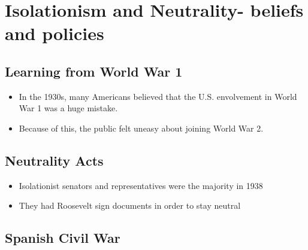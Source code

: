 \documentclass[12pt]{article} %
\begin{document}
	\section{Isolationism and Neutrality- beliefs and policies}

	\subsection{Learning from World War 1}
	\begin{itemize}
		\item In the 1930s, many Americans believed that the U.S. envolvement in World War 1 was a huge mistake.
		\item Because of this, the public felt uneasy about joining World War 2.
	\end{itemize}

	\subsection{Neutrality Acts}
	\begin{itemize}
		\item Isolationist senators and representatives were the majority in 1938 
		\item They had Roosevelt sign documents in order to stay neutral
	\end{itemize}

	\subsection{Spanish Civil War}






	\newpage
\end{document}
